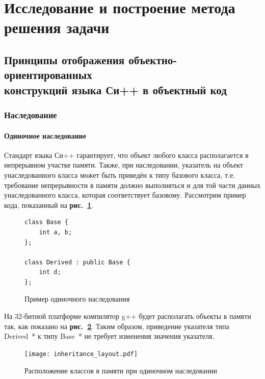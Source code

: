 \documentclass[a4paper,12pt,russian]{article}
\newcommand{\picref}[1]{\textbf{рис.~\ref{#1}}}
\newcommand{\code}[1]{\textsf{#1}}
\begin{document}
\newpage
\section{Исследование и построение метода решения задачи}
\subsection{Принципы отображения объектно-ориентированных \\конструкций языка Си++ в объектный код}
\subsubsection{Наследование}
\paragraph{Одиночное наследование}
Стандарт языка Си++ \cite{cpp_standard} гарантирует, что объект любого класса располагается в непрерывном участке памяти.
Также, при наследовании, указатель на объект унаследованного класса может быть приведён к типу базового класса, т.е. требование непрерывности в памяти должно выполняться и для той части данных унаследованного класса, которая соответствует базовому.
Рассмотрим пример кода, показанный на \picref{single_inheritance_lst}.
\begin{figure}[b]
\begin{lstlisting}
class Base {
    int a, b;
};

class Derived : public Base {
    int d;
};
\end{lstlisting}
\caption{Пример одиночного наследования}
\label{single_inheritance_lst}
\end{figure}
На 32-битной платформе компилятор g++ будет располагать объекты в памяти так, как показано на \picref{inheritance_layout_fig}. Таким образом, приведение указателя типа \code{Derived~*} к типу \code{Base~*} не требует изменения значения указателя.
\begin{figure}[b]
  \center
  \texttt{[image: inheritance\_layout.pdf]}
  \hfill
  \caption{Расположение классов в памяти при одиночном наследовании}
  \label{inheritance_layout_fig}
\end{figure}
\end{document}
